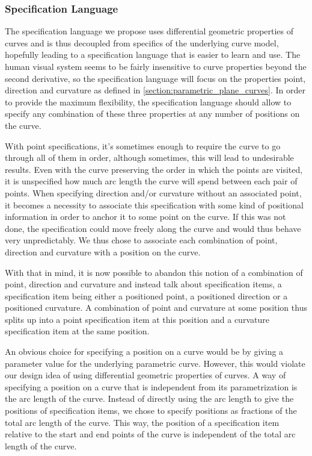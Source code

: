 \documentclass[a4paper]{article}
\begin{document}
			\subsubsection{Specification Language}
			\label{section:specification_language}

				The specification language we propose uses differential geometric properties of curves and is thus decoupled from specifics of the underlying curve model, hopefully leading to a specification language that is easier to learn and use. The human visual system seems to be fairly insensitive to curve properties beyond the second derivative, so the specification language will focus on the properties point, direction and curvature as defined in \ref{section:parametric_plane_curves}. In order to provide the maximum flexibility, the specification language should allow to specify any combination of these three properties at any number of positions on the curve.

				With point specifications, it's sometimes enough to require the curve to go through all of them in order, although sometimes, this will lead to undesirable results. Even with the curve preserving the order in which the points are visited, it is unspecified how much arc length the curve will spend between each pair of points. When specifying direction and/or curvature without an associated point, it becomes a necessity to associate this specification with some kind of positional information in order to anchor it to some point on the curve. If this was not done, the specification could move freely along the curve and would thus behave very unpredictably. We thus chose to associate each combination of point, direction and curvature with a position on the curve.

				With that in mind, it is now possible to abandon this notion of a combination of point, direction and curvature and instead talk about specification items, a specification item being either a positioned point, a positioned direction or a positioned curvature. A combination of point and curvature at some position thus splits up into a point specification item at this position and a curvature specification item at the same position.

				An obvious choice for specifying a position on a curve would be by giving a parameter value for the underlying parametric curve. However, this would violate our design idea of using differential geometric properties of curves. A way of specifying a position on a curve that is independent from its parametrization is the arc length of the curve. Instead of directly using the arc length to give the positions of specification items, we chose to specify positions as fractions of the total arc length of the curve. This way, the position of a specification item relative to the start and end points of the curve is independent of the total arc length of the curve.
\end{document}
